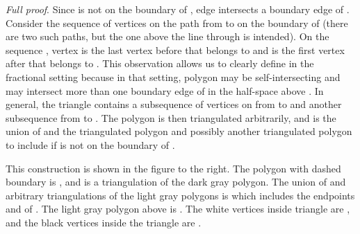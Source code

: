 \documentclass[final]{siamltex}
\newenvironment{fullproof}{\par{\it Full proof}. \ignorespaces}{\endproof}
\begin{document}
\begin{fullproof}
Since  is not on the boundary of , edge  intersects a boundary edge  of .
Consider the sequence  of vertices on the path from  to  on the boundary of 
(there are two such paths, but the one above the line through  is intended).
On the sequence , vertex  is the last vertex before  that belongs to  and 
 is the first vertex after  that belongs to . 
This observation allows us to clearly define  in 
the fractional setting because in that setting, polygon  may be self-intersecting 
and  may intersect more than one boundary edge of  in the half-space above .
In general, the triangle  contains a
subsequence  of vertices on  from  to  
and another subsequence  from  to . 
The polygon  is then triangulated arbitrarily, 
and  is the union of  and the triangulated polygon  and 
possibly another triangulated polygon to include  if  is not on the boundary of .
This construction is shown in the figure to the right.
The polygon with dashed boundary is , and  is a triangulation of the dark gray polygon.
The union of  and arbitrary triangulations of the light gray polygons is  
which includes the endpoints  and  of . 
The light gray polygon above  is .
The white vertices inside triangle  are
, and the black vertices inside the triangle are .


\end{window}
\end{fullproof}
\end{document}
